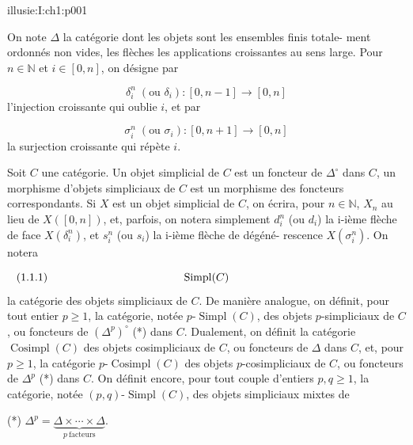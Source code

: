 \IllusieSetPhysicalPageSize{450.6bp}{704bp}
\begin{illusiebodypage}{illusie:I:ch1:p001}
\hypertarget{illusie:I:ch1}{}%
\hypertarget{illusie:I:ch1:s1}{}%
\hypertarget{illusie:I:ch1:s1:1}{}%

\hypertarget{illusie:I:ch1:s1:1:p1}{}%
On note $\Delta$ la catégorie dont les objets sont les ensembles finis totale-
ment ordonnés non vides, les flèches les applications croissantes au sens large.
Pour $n\in\mathbb{N}$ et $i\in[0,n]$, on désigne par

\hypertarget{illusie:I:ch1:s1:1:d1}{}%
\[
  \delta_i^n\; (\text{ou }\delta_i):[0,n-1]\longrightarrow[0,n]
\]
l'injection croissante qui oublie $i$, et par

\hypertarget{illusie:I:ch1:s1:1:d2}{}%
\[
  \sigma_i^n\; (\text{ou }\sigma_i):[0,n+1]\longrightarrow[0,n]
\]
la surjection croissante qui répète $i$.

\hypertarget{illusie:I:ch1:s1:1:p2}{}%
Soit $C$ une catégorie. Un objet simplicial de $C$ est un foncteur de
$\Delta^{\circ}$ dans $C$, un morphisme d'objets simpliciaux de $C$ est un
morphisme des foncteurs correspondants. Si $X$ est un objet simplicial de $C$,
on écrira, pour $n\in\mathbb{N}$, $X_n$ au lieu de $X([0,n])$, et, parfois, on
notera simplement $d_i^n$ (ou $d_i$) la i-ième flèche de face
$X(\delta_i^n)$, et $s_i^n$ (ou $s_i$) la i-ième flèche de dégéné-
rescence $X(\sigma_i^n)$. On notera

\hypertarget{illusie:I:ch1:s1:1:eq1}{}%
\[
  \makebox[\linewidth][s]{\text{(1.1.1)}\hfill$\operatorname{Simpl}(C)$\hfill\phantom{\text{(1.1.1)}}}
\]
la catégorie des objets simpliciaux de $C$. De manière analogue, on définit,
pour tout entier $p\geq1$, la catégorie, notée
$p\text{-}\operatorname{Simpl}(C)$, des objets $p$-simpliciaux de $C$, ou
foncteurs de $(\Delta^p)^{\circ}$ (*) dans $C$. Dualement, on définit la
catégorie $\operatorname{Cosimpl}(C)$ des objets cosimpliciaux de $C$, ou
foncteurs de $\Delta$ dans $C$, et, pour $p\geq1$, la catégorie
$p\text{-}\operatorname{Cosimpl}(C)$ des objets $p$-cosimpliciaux de $C$, ou
foncteurs de $\Delta^p$ (*) dans $C$. On définit encore, pour tout couple
d'entiers $p,q\geq1$, la catégorie, notée
$(p,q)\text{-}\operatorname{Simpl}(C)$, des objets simpliciaux mixtes de

\vfill
{}\hypertarget{illusie:I:ch1:s1:1:n1}{}%
{\fontsize{8}{9.5}\selectfont\noindent
(*) $\displaystyle \Delta^p=\underbrace{\Delta\times\cdots\times\Delta}_{p\ \text{facteurs}}$.}
\end{illusiebodypage}
